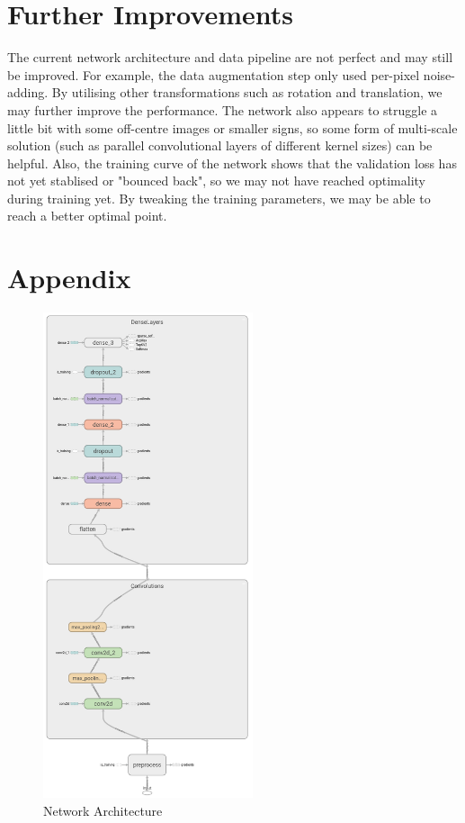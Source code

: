 \documentclass[]{article}
\begin{document}
\section{Further Improvements}

The current network architecture and data pipeline are not perfect and may still be improved. For example, the data augmentation step only used per-pixel noise-adding. By utilising other transformations such as rotation and translation, we may further improve the performance. The network also appears to struggle a little bit with some off-centre images or smaller signs, so some form of multi-scale solution (such as parallel convolutional layers of different kernel sizes) can be helpful. Also, the training curve of the network shows that the validation loss has not yet stablised or "bounced back", so we may not have reached optimality during training yet. By tweaking the training parameters, we may be able to reach a better optimal point.




\newpage
\section*{Appendix}

\begin{figure}[H]
	\centering
	\includegraphics[width=0.55\textwidth]{arch}
	\caption{Network Architecture}
	\label{fig:arch}
\end{figure}
\end{document}
